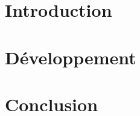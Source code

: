 \documentclass[a4paper,11pt,final,oneside]{article}
\begin{document}
  
  \cleardoublepage %
  \sloppy          %

  \part{Introduction}
  
  
  \cleardoublepage
  
  \cleardoublepage
  
  \cleardoublepage
  
  \cleardoublepage

  \part{Développement}

  
  \cleardoublepage
  
  \cleardoublepage
  
  \cleardoublepage
  
  \cleardoublepage

  \part{Conclusion}

  
  \cleardoublepage
  
  \cleardoublepage
  
\end{document}

